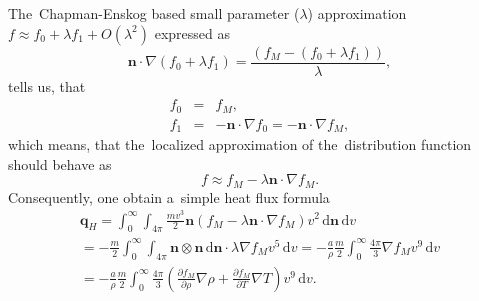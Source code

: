 \documentclass[review]{elsarticle}
\newcommand{\pdv}[2]{\frac{\partial{#1}}{\partial{#2}}}
\newcommand{\vect}[1]{\boldsymbol{#1}}
\newcommand{\dI}{\text{d}}
\newcommand{\mfp}{\lambda}
\newcommand{\vmag}{v}
\newcommand{\vn}{\vect{n}}
\newcommand{\fM}{f_M}
\begin{document}
The~Chapman-Enskog based small parameter ($\mfp$) approximation 
$f\approx f_0 + \lambda f_1 + O(\lambda^2)$ expressed as
\begin{equation}
  \vn\cdot\nabla (f_0 + \lambda f_1) = 
  \frac{\left(\fM - (f_0 + \lambda f_1)\right)}{\mfp} ,
  \label{eq:CE_BGK}
\end{equation}
tells us, that
\begin{eqnarray}
  f_0 &=& \fM, 
  \nonumber\\
  f_1 &=& - \vn\cdot\nabla f_0 = - \vn\cdot\nabla\fM,
  \nonumber
\end{eqnarray}
which means, that the~localized approximation of the~distribution function
should behave as
\begin{equation}
  f \approx \fM - \mfp\vn\cdot\nabla \fM .
  \label{eq:f_localized}
\end{equation}
Consequently, one obtain a~simple heat flux formula
\begin{multline}
  \vect{q}_H = \int_0^\infty \int_{4\pi} 
  \frac{m \vmag^3}{2} 
  \vn\left( \fM - \mfp\vn\cdot\nabla \fM \right) \vmag^2\, \dI\vn\, \dI\vmag \\
  = - \frac{m}{2}\int_0^\infty \int_{4\pi}  
  \vn\otimes\vn\, \dI\vn \cdot \mfp \nabla\fM \vmag^5\, \dI\vmag 
  = - \frac{a}{\rho}\frac{m}{2}\int_0^\infty \frac{4\pi}{3}
  \nabla\fM \vmag^9\, \dI\vmag \\
  = - \frac{a}{\rho}\frac{m}{2}\int_0^\infty \frac{4\pi}{3}
  \left(\pdv{\fM}{\rho}\nabla\rho + \pdv{\fM}{T}\nabla T \right) 
  \vmag^9\, \dI\vmag .
\end{multline}
\end{document}
